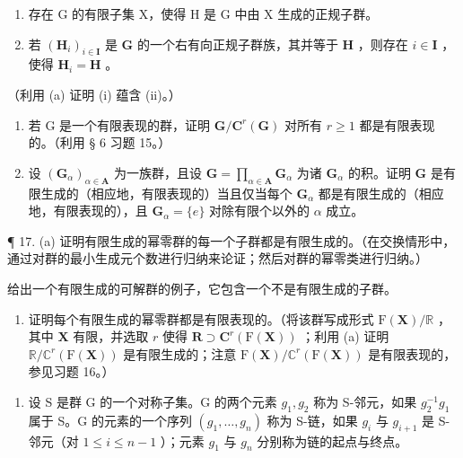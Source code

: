\begin{enumerate}
\def\labelenumi{(\roman{enumi})}
\setcounter{enumi}{1}
\item
  存在 G 的有限子集 X，使得 H 是 G 中由 X 生成的正规子群。
\item
  若 \((\mathbf{H}_i)_{i\in \mathbf{I}}\) 是 \(\mathbf{G}\) 的一个右有向正规子群族，其并等于 \(\mathbf{H}\) ，则存在 \(i\in \mathbf{I}\) ，使得 \(\mathbf{H}_i = \mathbf{H}\) 。
\end{enumerate}

（利用 (a) 证明 (i) 蕴含 (ii)。）

\begin{enumerate}
\def\labelenumi{(\alph{enumi})}
\setcounter{enumi}{4}
\item
  若 G 是一个有限表现的群，证明 \(\mathbf{G}/\mathbf{C}^{r}(\mathbf{G})\) 对所有 \(r \geqslant 1\) 都是有限表现的。（利用 § 6 习题 15。）
\item
  设 \((\mathbf{G}_{\alpha})_{\alpha \in \mathbf{A}}\) 为一族群，且设 \(\mathbf{G} = \prod_{\alpha \in \mathbf{A}} \mathbf{G}_{\alpha}\) 为诸 \(\mathbf{G}_{\alpha}\) 的积。证明 \(\mathbf{G}\) 是有限生成的（相应地，有限表现的）当且仅当每个 \(\mathbf{G}_{\alpha}\) 都是有限生成的（相应地，有限表现的），且 \(\mathbf{G}_{\alpha} = \{e\}\) 对除有限个以外的 \(\alpha\) 成立。
\end{enumerate}

¶ 17. (a) 证明有限生成的幂零群的每一个子群都是有限生成的。（在交换情形中，通过对群的最小生成元个数进行归纳来论证；然后对群的幂零类进行归纳。）

给出一个有限生成的可解群的例子，它包含一个不是有限生成的子群。

\begin{enumerate}
\def\labelenumi{(\alph{enumi})}
\setcounter{enumi}{1}
\tightlist
\item
  证明每个有限生成的幂零群都是有限表现的。（将该群写成形式 \(\mathrm{F}(\mathbf{X}) / \mathbb{R}\) ，其中 \(\mathbf{X}\) 有限，并选取 \(r\) 使得 \(\mathbf{R} \supset \mathbf{C}^r (\mathrm{F}(\mathbf{X}))\) ；利用 (a) 证明 \(\mathbb{R} / \mathbb{C}^r (\mathrm{F}(\mathbf{X}))\) 是有限生成的；注意 \(\mathrm{F}(\mathbf{X}) / \mathbb{C}^r (\mathrm{F}(\mathbf{X}))\) 是有限表现的，参见习题 16。）
\end{enumerate}

\begin{enumerate}
\def\labelenumi{\arabic{enumi}.}
\setcounter{enumi}{17}
\tightlist
\item
  设 S 是群 G 的一个对称子集。G 的两个元素 \(g_{1}, g_{2}\) 称为 S-邻元，如果 \(g_{2}^{-1}g_{1}\) 属于 S。G 的元素的一个序列 \((g_{1}, \ldots, g_{n})\) 称为 S-链，如果 \(g_{i}\) 与 \(g_{i+1}\) 是 S-邻元（对 \(1 \leqslant i \leqslant n - 1\) ）；元素 \(g_{1}\) 与 \(g_{n}\) 分别称为链的起点与终点。
\end{enumerate}


